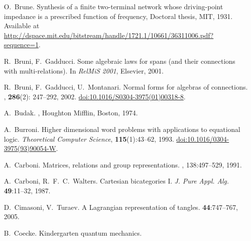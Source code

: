 \begin{thebibliography}{RSW00}
    O.\ Brune.
    \newblock Synthesis of a finite two-terminal network whose
    driving-point impedance is a prescribed function of frequency, Doctoral
    thesis, MIT, 1931.
    \newblock Available at
    \href{http://dspace.mit.edu/bitstream/handle/1721.1/10661/36311006.pdf?sequence=1}
    {http://dspace.mit.edu/bitstream/handle/1721.1/10661/36311006.pdf?sequence=1}.

    R.\ Bruni, F.\ Gadducci.
    \newblock Some algebraic laws for spans (and their
    connections with multi-relations).
    \newblock In \textsl{RelMiS 2001}, Elsevier, 2001.

    R.\ Bruni, F.\ Gadducci, U.\ Montanari.
    \newblock Normal forms for algebras of connections.
    , {\bf 286}(2): 247--292, 2002. 
    \newblock \href{http://dx.doi.org/10.1016/S0304-3975(01)00318-8}{doi:10.1016/S0304-3975(01)00318-8}.

    A.\ Budak.
    , Houghton Mifflin, Boston, 1974.

    A.\ Burroni.
    \newblock Higher dimensional word problems with
    applications to equational logic.
    \newblock \textsl{Theoretical Computer Science}, {\bf 115}(1):43--62, 1993.
    \newblock \href{http://dx.doi.org/10.1016/0304-3975(93)90054-W}{doi:10.1016/0304-3975(93)90054-W}.



    A.\ Carboni.
    \newblock Matrices, relations and group representations.
    , 138:497--529, 1991.

    A.\ Carboni, R.\ F.\ C.\ Walters.
    \newblock Cartesian bicategories I.
    \newblock \textsl{J. Pure Appl. Alg.} {\bf 49}:11--32, 1987. 

    D.\ Cimasoni, V.\ Turaev.
    \newblock A Lagrangian representation of tangles.
     {\bf 44}:747--767, 2005.
    
    B.\ Coecke.
    \newblock Kindergarten quantum mechanics.
    

\end{thebibliography}

